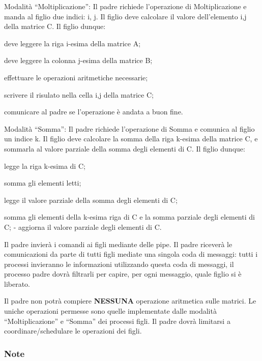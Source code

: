 \begin{DoxyEnumerate}
\item Modalità “\+Moltiplicazione”\+: Il padre richiede l’operazione di Moltiplicazione e manda al figlio due indici\+: i, j. Il figlio deve calcolare il valore dell’elemento i,j della matrice C. Il figlio dunque\+:
\begin{DoxyItemize}
\item deve leggere la riga i-\/esima della matrice A;
\item deve leggere la colonna j-\/esima della matrice B;
\item effettuare le operazioni aritmetiche necessarie;
\item scrivere il risulato nella cella i,j della matrice C;
\item comunicare al padre se l’operazione è andata a buon fine.
\end{DoxyItemize}
\item Modalità “\+Somma”\+: Il padre richiede l’operazione di Somma e comunica al figlio un indice k. Il figlio deve calcolare la somma della riga k-\/esima della matrice C, e sommarla al valore parziale della somma degli elementi di C. Il figlio dunque\+:
\begin{DoxyItemize}
\item legge la riga k-\/esima di C;
\item somma gli elementi letti;
\item legge il valore parziale della somma degli elementi di C;
\item somma gli elementi della k-\/esima riga di C e la somma parziale degli elementi di C; -\/ aggiorna il valore parziale degli elementi di C.
\end{DoxyItemize}
\end{DoxyEnumerate}

Il padre invierà i comandi ai figli mediante delle pipe. Il padre riceverà le comunicazioni da parte di tutti figli mediate una singola coda di messaggi\+: tutti i processi invieranno le informazioni utilizzando questa coda di messaggi, il processo padre dovrà filtrarli per capire, per ogni messaggio, quale figlio si è liberato.

Il padre non potrà compiere {\bfseries N\+E\+S\+S\+U\+NA} operazione aritmetica sulle matrici. Le uniche operazioni permesse sono quelle implementate dalle modalità “\+Moltiplicazione” e “\+Somma” dei processi figli. Il padre dovrà limitarsi a coordinare/schedulare le operazioni dei figli.

\subsubsection*{Note}


